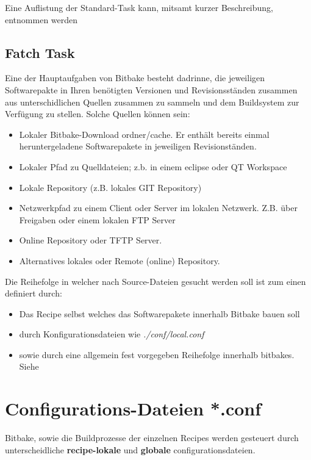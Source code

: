 Eine Auflistung der Standard-Task kann, mitsamt kurzer Beschreibung,
entnommen werden
\cite[S. 171-172]{Gonzalez2018:Embedded_Linux_Development_Using_Yocto_Project_Cookbook_2nd}

\subsection{Fatch Task}%
\label{sub:fatch_task}
Eine der Hauptaufgaben von Bitbake besteht dadrinne, die jeweiligen
Softwarepakte in Ihren benötigten Versionen und Revisionsständen zusammen aus
unterschidlichen Quellen zusammen zu sammeln und dem Buildsystem zur Verfügung
zu stellen. Solche Quellen können sein:

\begin{itemize}
    \item Lokaler Bitbake-Download ordner/cache. Er enthält bereits einmal
        heruntergeladene Softwarepakete in jeweiligen Revisionständen.
    \item Lokaler Pfad zu Quelldateien; z.b. in einem eclipse oder QT Workspace
    \item Lokale Repository (z.B. lokales GIT Repository)
    \item Netzwerkpfad zu einem Client oder Server im lokalen Netzwerk. Z.B.
        über Freigaben oder einem lokalen FTP Server
    \item Online Repository oder TFTP Server.
    \item Alternatives lokales oder Remote (online) Repository.
\end{itemize}

Die Reihe\-folge in welcher nach Source-Dateien gesucht werden soll ist zum
einen definiert durch:

\begin{itemize}
    \item Das Recipe selbst welches das Software\-pakete innerhalb Bitbake bauen
        soll
    \item durch Konfigurationsdateien wie \textit{./conf/local.conf}
    \item sowie durch eine allgemein fest vorgegeben Reihefolge innerhalb
    bitbakes. Siehe
    \cite[S.53]{Gonzalez2018:Embedded_Linux_Development_Using_Yocto_Project_Cookbook_2nd}
\end{itemize}

\section{Configurations-Dateien *.conf}%
\label{sec:configurations_dateien_conf}
Bitbake, sowie die Buildprozesse der einzelnen Recipes
werden gesteuert durch unterscheidliche \textbf{recipe-lokale} und
\textbf{globale} configurationsdateien.



